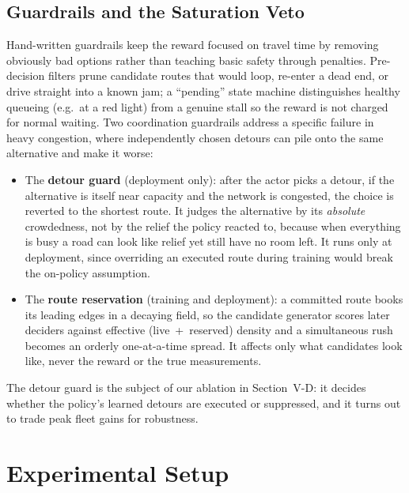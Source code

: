 \subsection{Guardrails and the Saturation Veto}
Hand-written guardrails keep the reward focused on travel time by removing obviously bad
options rather than teaching basic safety through penalties. Pre-decision filters prune
candidate routes that would loop, re-enter a dead end, or drive straight into a known jam;
a ``pending'' state machine distinguishes healthy queueing (e.g.\ at a red light) from a
genuine stall so the reward is not charged for normal waiting. Two coordination guardrails
address a specific failure in heavy congestion, where independently chosen detours can pile
onto the same alternative and make it worse:
\begin{itemize}
  \item The \textbf{detour guard} (deployment only): after the actor picks a detour, if the
  alternative is itself near capacity and the network is congested, the choice is reverted
  to the shortest route. It judges the alternative by its \emph{absolute} crowdedness, not
  by the relief the policy reacted to, because when everything is busy a road can look like
  relief yet still have no room left. It runs only at deployment, since overriding an
  executed route during training would break the on-policy assumption.
  \item The \textbf{route reservation} (training and deployment): a committed route books
  its leading edges in a decaying field, so the candidate generator scores later deciders
  against effective (live~+~reserved) density and a simultaneous rush becomes an orderly
  one-at-a-time spread. It affects only what candidates look like, never the reward or the
  true measurements.
\end{itemize}
The detour guard is the subject of our ablation in Section~V-D: it decides whether the
policy's learned detours are executed or suppressed, and it turns out to trade peak fleet
gains for robustness.

\section{Experimental Setup}

